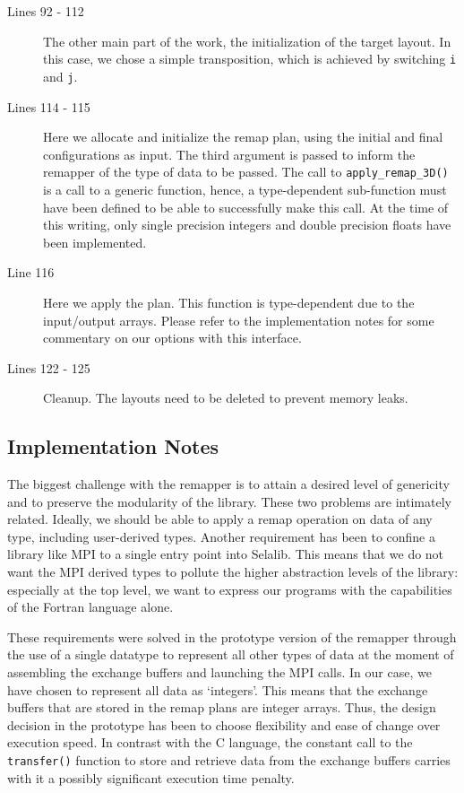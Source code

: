 \documentclass[]{report}   %
\begin{document}
\begin{description}
\item[Lines 92 - 112]
The other main part of the work, the initialization of the target layout. In this case, we chose a simple transposition, which is achieved by switching \verb+i+ and \verb+j+.

\item[Lines 114 - 115]
Here we allocate and initialize the remap plan, using the initial and final configurations as input. The third argument is passed to inform the remapper of the type of data to be passed. The call to \verb+apply_remap_3D()+ is a call to a generic function, hence, a type-dependent sub-function must have been defined to be able to successfully make this call. At the time of this writing, only single precision integers and double precision floats have been implemented. 

\item[Line 116]
Here we apply the plan. This function is type-dependent due to the input/output arrays. Please refer to the implementation notes for some commentary on our options with this interface.

\item[Lines 122 - 125]
Cleanup. The layouts need to be deleted to prevent memory leaks. 

\end{description}

\subsection{Implementation Notes}
The biggest challenge with the remapper is to attain a desired level of genericity and to preserve the modularity of the library. These two problems are intimately related. Ideally, we should be able to apply a remap operation on data of any type, including user-derived types. Another requirement has been to confine a library like MPI to a single entry point into Selalib. This means that we do not want the MPI derived types to pollute the higher abstraction levels of the library: especially at the top level, we want to express our programs with the capabilities of the Fortran language alone.

These requirements were solved in the prototype version of the remapper through the use of a single datatype to represent all other types of data at the moment of assembling the exchange buffers and launching the MPI calls. In our case, we have chosen to represent all data as `integers'. This means that the exchange buffers that are stored in the remap plans are integer arrays. Thus, the design decision in the prototype has been to choose flexibility and ease of change over execution speed. In contrast with the C language, the constant call to the \verb+transfer()+ function to store and retrieve data from the exchange buffers carries with it a possibly significant execution time penalty.
\end{document}

